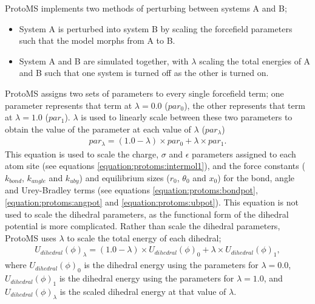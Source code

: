 \documentclass[letterpaper,10pt,english]{sphinxmanual}
\begin{document}
ProtoMS implements two methods of perturbing between systems A and B;
\begin{itemize}
\item {} 
 System A is perturbed into system B by scaling the forcefield parameters such that the model morphs from A to B.

\item {} 
 System A and B are simulated together, with \(\lambda\) scaling the total energies of A and B such that one system is turned off as the other is turned on.

\end{itemize}

\ignorespaces 
{}

ProtoMS assigns two sets of parameters to every single forcefield term; one parameter represents that term at \(\lambda=0.0\) (\(par_0\)), the other represents that term at \(\lambda=1.0\) (\(par_1\)). \(\lambda\) is used to linearly scale between these two parameters to obtain the value of the parameter at each value of \(\lambda\) (\(par_\lambda\))
\begin{equation}\label{equation:protoms:lambdamix}
\begin{split}par_\lambda = (1.0-\lambda) \times par_0 + \lambda \times par_1.\end{split}
\end{equation}
This equation is used to scale the charge, \(\sigma\) and \(\epsilon\) parameters assigned to each atom site (see equations \eqref{equation:protoms:intermol1}), and the force constants (\(k_{bond}\), \(k_{angle}\) and \(k_{uby}\)) and equilibrium sizes (\(r_0\), \(\theta_0\) and \(x_0\)) for the bond, angle and Urey-Bradley terms (see equations \eqref{equation:protoms:bondpot}, \eqref{equation:protoms:angpot} and \eqref{equation:protoms:ubpot}). This equation is not used to scale the dihedral parameters, as the functional form of the dihedral potential is more complicated. Rather than scale the dihedral parameters, ProtoMS uses \(\lambda\) to scale the total energy of each dihedral;
\begin{equation}\label{equation:protoms:dihmix}
\begin{split}U_{dihedral}(\phi)_\lambda = (1.0-\lambda)\times U_{dihedral}(\phi)_0 + \lambda \times U_{dihedral}(\phi)_1,\end{split}
\end{equation}
where \(U_{dihedral}(\phi)_0\) is the dihedral energy using the parameters for \(\lambda=0.0\), \(U_{dihedral}(\phi)_1\) is the dihedral energy using the parameters for \(\lambda=1.0\), and \(U_{dihedral}(\phi)_\lambda\) is the scaled dihedral energy at that value of \(\lambda\).
\end{document}
